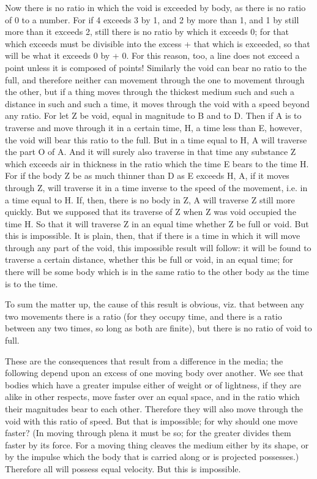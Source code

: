 Now there is no ratio in which the void is exceeded by body, as there
is no ratio of 0 to a number. For if 4 exceeds 3 by 1, and 2 by more
than 1, and 1 by still more than it exceeds 2, still there is no ratio
by which it exceeds 0; for that which exceeds must be divisible into
the excess + that which is exceeded, so that will be what it exceeds
0 by + 0. For this reason, too, a line does not exceed a point unless
it is composed of points! Similarly the void can bear no ratio to
the full, and therefore neither can movement through the one to movement
through the other, but if a thing moves through the thickest medium
such and such a distance in such and such a time, it moves through
the void with a speed beyond any ratio. For let Z be void, equal in
magnitude to B and to D. Then if A is to traverse and move through
it in a certain time, H, a time less than E, however, the void will
bear this ratio to the full. But in a time equal to H, A will traverse
the part O of A. And it will surely also traverse in that time any
substance Z which exceeds air in thickness in the ratio which the
time E bears to the time H. For if the body Z be as much thinner than
D as E exceeds H, A, if it moves through Z, will traverse it in a
time inverse to the speed of the movement, i.e. in a time equal to
H. If, then, there is no body in Z, A will traverse Z still more quickly.
But we supposed that its traverse of Z when Z was void occupied the
time H. So that it will traverse Z in an equal time whether Z be full
or void. But this is impossible. It is plain, then, that if there
is a time in which it will move through any part of the void, this
impossible result will follow: it will be found to traverse a certain
distance, whether this be full or void, in an equal time; for there
will be some body which is in the same ratio to the other body as
the time is to the time. 

To sum the matter up, the cause of this result is obvious, viz. that
between any two movements there is a ratio (for they occupy time,
and there is a ratio between any two times, so long as both are finite),
but there is no ratio of void to full. 

These are the consequences that result from a difference in the media;
the following depend upon an excess of one moving body over another.
We see that bodies which have a greater impulse either of weight or
of lightness, if they are alike in other respects, move faster over
an equal space, and in the ratio which their magnitudes bear to each
other. Therefore they will also move through the void with this ratio
of speed. But that is impossible; for why should one move faster?
(In moving through plena it must be so; for the greater divides them
faster by its force. For a moving thing cleaves the medium either
by its shape, or by the impulse which the body that is carried along
or is projected possesses.) Therefore all will possess equal velocity.
But this is impossible. 

